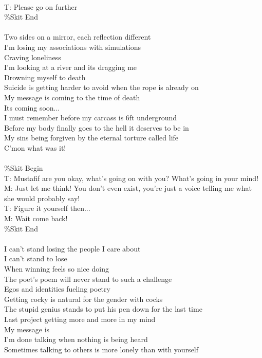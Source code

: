 \documentclass[12pt, b5paper, oneside]{book}
\begin{document}
\\T: Please go on further
\\\%Skit End
%
\\\\Two sides on a mirror, each reflection different
\\I'm losing my associations with simulations
\\Craving loneliness
\\I'm looking at a river and its dragging me
\\Drowning myself to death
\\Suicide is getting harder to avoid when the rope is already on
\\My message is coming to the time of death
\\Its coming soon...
\\I must remember before my carcass is 6ft underground
\\Before my body finally goes to the hell it deserves to be in
\\My sins being forgiven by the eternal torture called life
\\C'mon what was it!
%
\\\\\%Skit Begin
\\T: Mustafif are you okay, what's going on with you? What's going in your mind!
\\M: Just let me think! You don't even exist, you're just a voice telling me what she would probably say!
\\T: Figure it yourself then...
\\M: Wait come back!
\\\%Skit End
%
\\\\I can't stand losing the people I care about
\\I can't stand to lose
\\When winning feels so nice doing
\\The poet's poem will never stand to such a challenge
\\Egos and identities fueling poetry
\\Getting cocky is natural for the gender with cocks
\\The stupid genius stands to put his pen down for the last time
\\Last project getting more and more in my mind
\\My message is
\\I'm done talking when nothing is being heard
\\Sometimes talking to others is more lonely than with yourself
\end{document}
